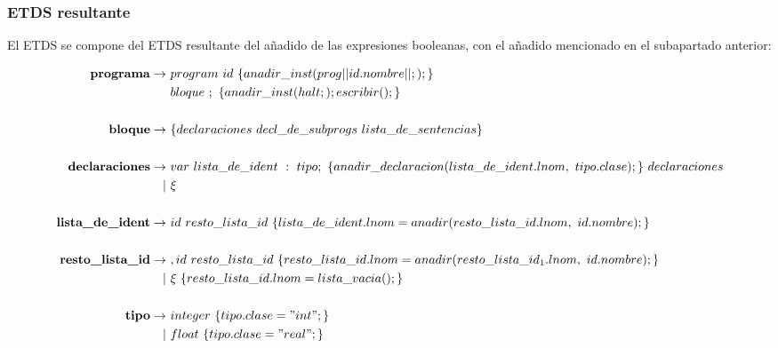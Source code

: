 \documentclass[12pt,a4paper,landscape]{article}
\theoremstyle{mytheor}
\begin{document}
\subsubsection{ETDS resultante}
El ETDS se compone del ETDS resultante del añadido de las expresiones booleanas, con el añadido mencionado en el subapartado anterior:

\begin{center}
  \begin{align*}
    \text{\textbf{programa}} \to\ & program\ id\ \{ anadir\_inst( prog|| id.nombre || ;); \}\\
    & bloque\  ;\  \{ anadir\_inst(halt; ); escribir();\}\\\\
    \text{\textbf{ bloque}} \to\ &\{ declaraciones\ decl\_de\_subprogs\ lista\_de\_sentencias \}\\\\
    \text{\textbf{declaraciones}} \to\ & var\ lista\_de\_ident\ :\ tipo;\ \{ anadir\_declaracion(lista\_de\_ident.lnom,\ tipo.clase);\}\ declaraciones\\
    |\ &\xi\\\\
    \text{\textbf{lista\_de\_ident}} \to\ & id\ resto\_lista\_id\ \{lista\_de\_ident.lnom=anadir(resto\_lista\_id.lnom,\ id.nombre);\}\\\\
    \text{\textbf{ resto\_lista\_id}} \to\ & ,id\ resto\_lista\_id\  \{resto\_lista\_id.lnom=anadir(resto\_lista\_id_1.lnom,\ id.nombre);\} \\
    |\ &\xi\ \{resto\_lista\_id.lnom=lista\_vacia();\}\\\\
     \text{\textbf{tipo}} \to\ & integer\ \{tipo.clase="int"; \}\\
    |\ & float\ \{tipo.clase="real"; \}\\\\
  \end{align*}
\end{center}
\end{document}
